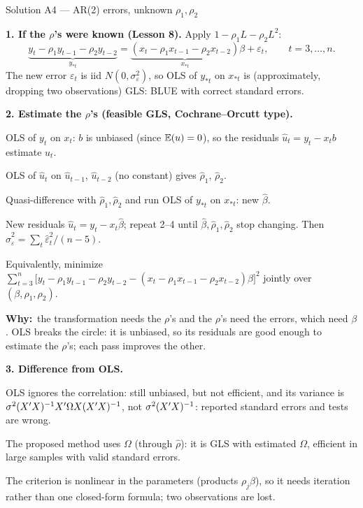 \documentclass[11pt]{article}
\newcommand{\step}[1]{\par\smallskip\noindent\textbf{\textcolor{qnavy}{#1}}\quad\ignorespaces}
\newcommand{\Why}{\textbf{\textcolor{whyline}{Why:}}\ }
\begin{document}
\begin{solbox}{Solution A4 --- AR(2) errors, unknown $\rho_{1}, \rho_{2}$}
\step{1. If the $\rho$'s were known (Lesson 8).} Apply $1 - \rho_{1}L - \rho_{2}L^{2}$:
\[
  \underbrace{y_{t} - \rho_{1}y_{t-1} - \rho_{2}y_{t-2}}_{y_{*t}}
  = \underbrace{(x_{t} - \rho_{1}x_{t-1} - \rho_{2}x_{t-2})}_{x_{*t}}\beta + \varepsilon_{t},
  \qquad t = 3,\dots,n .
\]
The new error $\varepsilon_{t}$ is iid $N(0,\sigma_{\varepsilon}^{2})$, so OLS of $y_{*t}$ on $x_{*t}$
is (approximately, dropping two observations) GLS: BLUE with correct standard errors.

\step{2. Estimate the $\rho$'s (feasible GLS, Cochrane--Orcutt type).}
\begin{flatnum}
  \item OLS of $y_{t}$ on $x_{t}$: $b$ is unbiased (since $\mathbb{E}(u) = 0$), so the residuals
        $\hat u_{t} = y_{t} - x_{t}b$ estimate $u_{t}$.
  \item OLS of $\hat u_{t}$ on $\hat u_{t-1}$, $\hat u_{t-2}$ (no constant) gives $\hat\rho_{1}$, $\hat\rho_{2}$.
  \item Quasi-difference with $\hat\rho_{1}, \hat\rho_{2}$ and run OLS of $y_{*t}$ on $x_{*t}$: new $\hat\beta$.
  \item New residuals $\hat u_{t} = y_{t} - x_{t}\hat\beta$; repeat 2--4 until $\hat\beta, \hat\rho_{1}, \hat\rho_{2}$
        stop changing. Then $\hat\sigma_{\varepsilon}^{2} = \sum_{t}\hat\varepsilon_{t}^{2}/(n - 5)$.
\end{flatnum}
Equivalently, minimize $\sum_{t=3}^{n}\big[y_{t} - \rho_{1}y_{t-1} - \rho_{2}y_{t-2}
 - (x_{t} - \rho_{1}x_{t-1} - \rho_{2}x_{t-2})\beta\big]^{2}$ jointly over $(\beta,\rho_{1},\rho_{2})$.
\begin{why}\Why the transformation needs the $\rho$'s and the $\rho$'s need the errors,
which need $\beta$. OLS breaks the circle: it is unbiased, so its residuals are good
enough to estimate the $\rho$'s; each pass improves the other.\end{why}
\step{3. Difference from OLS.}
\begin{flatlist}
  \item OLS ignores the correlation: still unbiased, but not efficient, and its variance is
        $\sigma^{2}(X^{\prime} X)^{-1}X^{\prime}\Omega X(X^{\prime} X)^{-1}$, not $\sigma^{2}(X^{\prime} X)^{-1}$: reported
        standard errors and tests are wrong.
  \item The proposed method uses $\Omega$ (through $\hat\rho$): it is GLS with estimated $\Omega$,
        efficient in large samples with valid standard errors.
  \item The criterion is nonlinear in the parameters (products $\rho_{j}\beta$), so it needs
        iteration rather than one closed-form formula; two observations are lost.
\end{flatlist}
\end{solbox}
\end{document}
